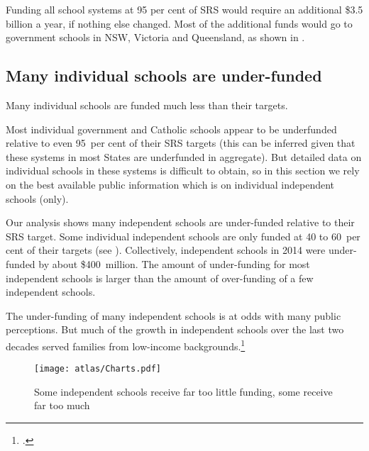 \documentclass{grattan}
\begin{document}
Funding all school systems at 95 per cent of SRS would require an additional \$3.5 billion a year, if nothing else changed.
Most of the additional funds would go to government schools in NSW, Victoria and Queensland, as shown in .
\cleardoublepage


\subsection{Many individual schools are under-funded }\label{subsec:most-schools-are-under-funded}

Many individual schools are funded much less than their targets.

Most individual government and Catholic schools appear to be underfunded relative to even 95~per cent of their SRS targets (this can be inferred given that these systems in most States are underfunded in aggregate). But detailed data on individual schools in these systems is difficult to obtain, so in this section we rely on the best available public information which is on individual independent schools (only).

Our analysis shows many independent schools are under-funded relative to their SRS target. Some individual independent schools are only funded at 40 to 60~per cent of their targets (see ).
Collectively, independent schools in 2014 were under-funded by about \$400~million.
The amount of under-funding for most independent schools is larger than the amount of over-funding of a few independent schools.

The under-funding of many independent schools is at odds with many public perceptions. But much of the growth in independent schools over the last two decades served families from low-income backgrounds.\footcites{KingndTheStructureandFunding}{Buckingham2016OneSchoolDoes}

\begin{figure}
\caption{Some independent schools receive far too little funding, some receive far too much\label{fig:some-independent-schools-well-below-SRS-target}}


\texttt{[image: atlas/Charts.pdf]}

\end{figure}
\end{document}

